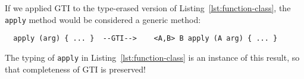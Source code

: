If we applied GTI to the type-erased version of
Listing~\ref{lst:function-class}, the \texttt{apply} method would be considered a generic method: 
\begin{lstlisting}
  apply (arg) { ... }  --GTI-->    <A,B> B apply (A arg) { ... }
\end{lstlisting}
The typing of \texttt{apply} in Listing~\ref{lst:function-class} is an
instance of this result, so that completeness of GTI is preserved!



